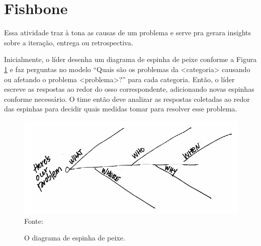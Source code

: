 \documentclass{iiufrgs}
\newcommand{\fonte}[1]{\\Fonte: {#1}}
\begin{document}
\section{Fishbone}

Essa atividade traz à tona as causas de um problema e serve pra gerara insights sobre a iteração, entrega ou retrospectiva.

Inicialmente, o líder desenha um diagrama de espinha de peixe conforme a Figura \ref{fig:fishbone} e faz perguntas no modelo \enquote{Quais são os problemas da <categoria> causando ou afetando o problema <problema>?} para cada categoria. Então, o líder escreve as respostas ao redor do osso correspondente, adicionando novas espinhas conforme necessário. O time então deve analizar as respostas coletadas ao redor das espinhas para decidir quais medidas tomar para resolver esse problema.

\begin{figure}[htbp]
    \centering
    \caption{O diagrama de espinha de peixe.}
    \includegraphics[scale=0.8]{images/fishbone.png}
    \label{fig:fishbone}
    \fonte{\cite{Derby2006Retrospectives}}
\end{figure}



 
\end{document}

